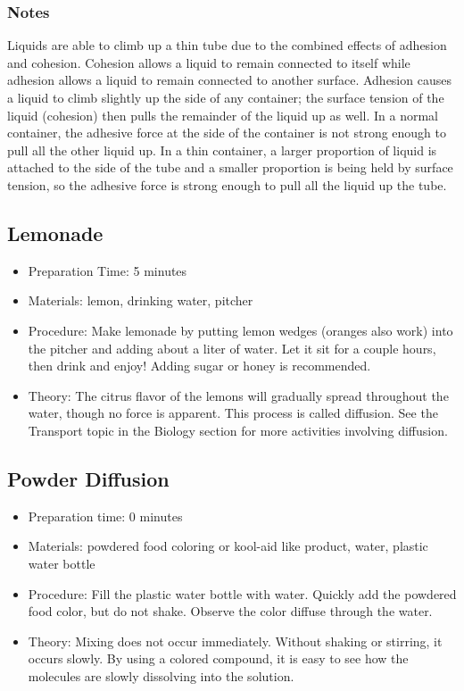 \subsubsection*{Notes}
Liquids are able to climb up a thin tube due to the combined effects of adhesion and cohesion. Cohesion allows a liquid to remain connected to itself while adhesion allows a liquid to remain connected to another surface. Adhesion causes a liquid to climb slightly up the side of any container; the surface tension of the liquid (cohesion) then pulls the remainder of the liquid up as well. In a normal container, the adhesive force at the side of the container is not strong enough to pull all the other liquid up. In a thin container, a larger proportion of liquid is attached to the side of the tube and a smaller proportion is being held by surface tension, so the adhesive force is strong enough to pull all the liquid up the tube.





\subsection{Lemonade}
\begin{itemize}
\item{Preparation Time: 5 minutes}
\item{Materials: lemon, drinking water, pitcher}
\item{Procedure: Make lemonade by putting lemon wedges (oranges also work) into the pitcher and adding about a liter of water. Let it sit for a couple hours, then drink and enjoy! Adding sugar or honey is recommended.}
\item{Theory: The citrus flavor of the lemons will gradually spread throughout the water, though no force is apparent. This process is called diffusion. See the Transport topic in the Biology section for more activities involving diffusion.}
\end{itemize}


\subsection{Powder Diffusion}
\begin{itemize}
\item{Preparation time: 0 minutes}
\item{Materials: powdered food coloring or kool-aid like product, water, plastic water bottle}
\item{Procedure: Fill the plastic water bottle with water. Quickly add the powdered food color, but do not shake. Observe the color diffuse through the water.}
\item{Theory: Mixing does not occur immediately. Without shaking or stirring, it occurs slowly. By using a colored compound, it is easy to see how the molecules are slowly dissolving into the solution.}
\end{itemize}

